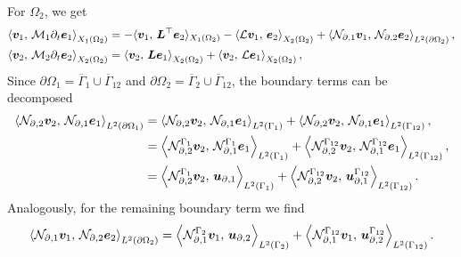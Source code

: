 For $\Omega_2$, we get
\begin{equation}\label{eq:pHlinsys_weak_Om2}
\begin{aligned}
\inner[X_1(\Omega_2)]{\bm{v}_1}{\mathcal{M}_1 \partial_t \bm{e}_1} &=   -  \langle{\bm{v}_1}, \,{\bm{L}^\top \bm{e}_2}\rangle_{X_1(\Omega_2)}  -\inner[X_2(\Omega_2)]{\mathcal{L}\bm{v}_1}{\bm{e}_2} + \inner[L^2(\partial\Omega_2)]{\mathcal{N}_{\partial, 1} \bm{v}_1}{\mathcal{N}_{\partial, 2}\bm{e}_2}, \\
\inner[X_2(\Omega_2)]{\bm{v}_2}{\mathcal{M}_2 \partial_t \bm{e}_2} &=   \inner[X_2(\Omega_2)]{\bm{v}_2}{\bm{L}\bm{e}_1} + \inner[X_2(\Omega_2)]{\bm{v}_2}{\mathcal{L}\bm{e}_1}, \\
\end{aligned}
\end{equation}
Since $\partial\Omega_1 = \overline{\Gamma}_1 \cup \overline\Gamma_{12}$ and $\partial\Omega_2 = \overline\Gamma_2 \cup \overline\Gamma_{12}$, the boundary terms can be decomposed 
\begin{equation}\label{eq:bdsplit_Om1}
\begin{aligned}
\inner[L^2(\partial\Omega_1)]{\mathcal{N}_{\partial, 2} \bm{v}_2}{\mathcal{N}_{\partial, 1}\bm{e}_1} &= \inner[L^2(\Gamma_1)]{\mathcal{N}_{\partial, 2} \bm{v}_2}{\mathcal{N}_{\partial, 1}\bm{e}_1} + \inner[L^2(\Gamma_{12})]{\mathcal{N}_{\partial, 2} \bm{v}_2}{\mathcal{N}_{\partial, 1}\bm{e}_1}, \\
&= \inner[L^2(\Gamma_1)]{\mathcal{N}_{\partial, 2}^{\Gamma_1} \bm{v}_2}{\mathcal{N}_{\partial, 1}^{\Gamma_1} \bm{e}_1} + \inner[L^2(\Gamma_{12})]{\mathcal{N}_{\partial, 2}^{\Gamma_{12}} \bm{v}_2}{\mathcal{N}_{\partial, 1}^{\Gamma_{12}}\bm{e}_1}, \\
&= \inner[L^2(\Gamma_1)]{\mathcal{N}_{\partial, 2}^{\Gamma_1} \bm{v}_2}{\bm{u}_{\partial, 1}} + \inner[L^2(\Gamma_{12})]{\mathcal{N}_{\partial, 2}^{\Gamma_{12}} \bm{v}_2}{\bm{u}_{\partial, 1}^{\Gamma_{12}}}.
\end{aligned}
\end{equation}
Analogously, for the remaining boundary term we find
\begin{equation}\label{eq:bdsplit_Om2}
\begin{aligned}
\inner[L^2(\partial\Omega_2)]{\mathcal{N}_{\partial,1} \bm{v}_1}{\mathcal{N}_{\partial, 2}\bm{e}_2} = \inner[L^2(\Gamma_2)]{\mathcal{N}_{\partial, 1}^{\Gamma_2} \bm{v}_1}{\bm{u}_{\partial, 2}} + \inner[L^2(\Gamma_{12})]{\mathcal{N}_{\partial, 1}^{\Gamma_{12}} \bm{v}_1}{\bm{u}_{\partial, 2}^{\Gamma_{12}}}.
\end{aligned}
\end{equation}
